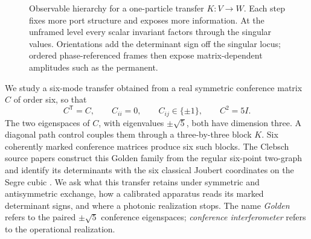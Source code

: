 \documentclass[11pt]{article}
\theoremstyle{remark}
\newcommand{\per}{\operatorname{per}}
\begin{document}
\begin{figure}[t]
\centering
{}
\caption{Observable hierarchy for a one-particle transfer \(K:V\to W\).
Each step fixes more port structure and exposes more information.
At the unframed level every scalar invariant factors through the singular
values.  Orientations add the determinant sign off the singular locus;
ordered phase-referenced frames then expose matrix-dependent amplitudes such
as the permanent.}
\label{fig:observable-hierarchy}
\end{figure}

We study a six-mode transfer obtained from a real symmetric conference
matrix \(C\) of order six, so that
\[
 C^{\mathsf T}=C,\qquad C_{ii}=0,\qquad C_{ij}\in\{\pm1\},
 \qquad C^2=5I.
\]
The two eigenspaces of \(C\), with eigenvalues \(\pm\sqrt5\), both have
dimension three.  A diagonal path control couples them through a
three-by-three block \(K\).  Six coherently marked conference matrices produce
six such blocks.  The Clebsch source papers construct this Golden family from
the regular six-point two-graph and identify its determinants with the six
classical Joubert coordinates on the Segre cubic
\cite{ClebschI,ClebschIII}.  We ask what this transfer retains under
symmetric and antisymmetric exchange, how a calibrated apparatus reads its
marked determinant signs, and where a photonic realization stops.  The name
\emph{Golden} refers to the paired \(\pm\sqrt5\) conference eigenspaces;
\emph{conference interferometer} refers to the operational realization.
\end{document}
